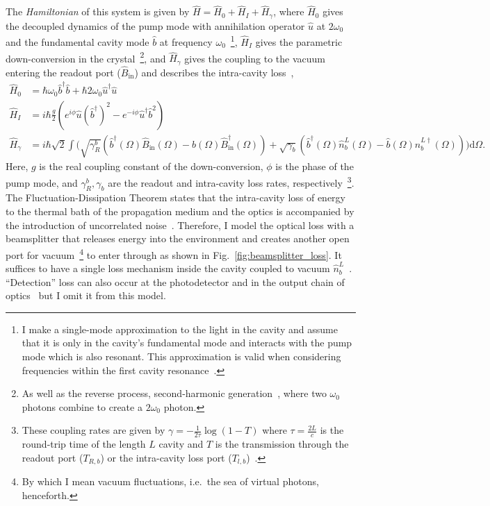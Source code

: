 The \emph{Hamiltonian} of this system is given by $\hat H = \hat H_0 + \hat H_I + \hat H_\gamma$, where $\hat H_0$ gives the decoupled dynamics of the pump mode with annihilation operator $\hat u$ at $2\omega_0$ and the fundamental cavity mode $\hat b$ at frequency $\omega_0$~\footnote{I make a single-mode approximation to the light in the cavity and assume that it is only in the cavity's fundamental mode and interacts with the pump mode which is also resonant. This approximation is valid when considering frequencies within the first cavity resonance~\cite{}.}, $\hat H_I$ gives the parametric down-conversion in the crystal~\footnote{As well as the reverse process, second-harmonic generation~\cite{}, where two $\omega_0$ photons combine to create a $2\omega_0$ photon.}, and $\hat H_\gamma$ gives the coupling to the vacuum entering the readout port ($\hat B_\text{in}$) and describes the intra-cavity loss~\cite{korobkoQuantumExpanderGravitationalwave2019}, 
\begin{align}
\hat H_0 &= \hbar \omega_0 \hat b^\dag \hat b + \hbar 2 \omega_0 \hat u^\dag \hat u\\
\hat H_I &= i \hbar \frac{g}{2} (e^{i\phi} \hat u (\hat b^\dag)^2 - e^{-i\phi} \hat u^\dag \hat b^2)\\
\hat H_\gamma &= i\hbar \sqrt{2}\int \biggl( \sqrt{\gamma^b_R}\left(\hat{b}^\dag(\Omega)\hat{B}_\text{in}(\Omega)-\hat{b}(\Omega)\hat{B}_\text{in}^\dag(\Omega)\right) + \sqrt{\gamma_b}\left(\hat{b}^\dag(\Omega)\hat n^L_b(\Omega)-\hat{b}(\Omega)\hat{n}^{L\dag}_b(\Omega)\right)\biggr)\text{d}\Omega .\nonumber
\end{align} %
Here, $g$ is the real coupling constant of the down-conversion, $\phi$ is the phase of the pump mode, and $\gamma^b_R,\gamma_b$ are the readout and intra-cavity loss rates, respectively~\footnote{These coupling rates are given by $\gamma = -\frac{1}{2\tau}\log(1-T)$ where $\tau = \frac{2L}{c}$ is the round-trip time of the length $L$ cavity and $T$ is the transmission through the readout port ($T_{R,b}$) or the intra-cavity loss port ($T_{l,b}$)~\cite{}.}. %
The Fluctuation-Dissipation Theorem states that the intra-cavity loss of energy to the thermal bath of the propagation medium and the optics is accompanied by the introduction of uncorrelated noise~\cite{}. Therefore, I model the optical loss with a beamsplitter that releases energy into the environment and creates another open port for vacuum~\footnote{By which I mean vacuum fluctuations, i.e.\ the sea of virtual photons, henceforth.} to enter through as shown in Fig.~\ref{fig:beamsplitter_loss}. It suffices to have a single loss mechanism inside the cavity coupled to vacuum $\hat n^L_b$~\cite{}. ``Detection'' loss can also occur at the photodetector and in the output chain of optics~\cite{} but I omit it from this model.

